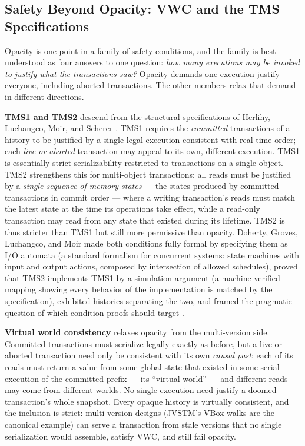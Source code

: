 \subsection{Safety Beyond Opacity: VWC and the TMS Specifications}
\label{sec:safety-family}

Opacity is one point in a family of safety conditions, and the family is
best understood as four answers to one question: \emph{how many executions
may be invoked to justify what the transactions saw?} Opacity demands one
execution justify everyone, including aborted transactions. The other
members relax that demand in different directions.

\textbf{TMS1 and TMS2} descend from the structural specifications of
Herlihy, Luchangco, Moir, and Scherer \cite{herlihy03tms1,herlihy03tms2}.
TMS1 requires the \emph{committed} transactions of a history to be
justified by a single legal execution consistent with real-time order;
each \emph{live or aborted} transaction may appeal to its own, different
execution. TMS1 is essentially strict serializability restricted to
transactions on a single object. TMS2 strengthens this for multi-object
transactions: all reads must be justified by a \emph{single sequence of
memory states} --- the states produced by committed transactions in
commit order --- where a writing transaction's reads must match the latest
state at the time its operations take effect, while a read-only
transaction may read from any state that existed during its lifetime.
TMS2 is thus stricter than TMS1 but still more permissive than opacity.
Doherty, Groves, Luchangco, and Moir made both conditions fully formal by
specifying them as I/O automata (a standard formalism for concurrent
systems: state machines with input and output actions, composed by
intersection of allowed schedules), proved that TMS2 implements TMS1 by a
simulation argument (a machine-verified mapping showing every behavior of
the implementation is matched by the specification), exhibited histories separating the two, and framed
the pragmatic question of which condition proofs should target
\cite{doherty13tms}.

\textbf{Virtual world consistency} \cite{imbs09vwc,imbs12vwc} relaxes
opacity from the multi-version side. Committed transactions must serialize
legally exactly as before, but a live or aborted transaction need only be
consistent with its own \emph{causal past}: each of its reads must return
a value from some global state that existed in some serial execution of
the committed prefix --- its ``virtual world'' --- and different reads may
come from different worlds. No single execution need justify a doomed
transaction's whole snapshot. Every opaque history is virtually
consistent, and the inclusion is strict: multi-version designs (JVSTM's
VBox walks are the canonical example) can serve a transaction from stale
versions that no single serialization would assemble, satisfy VWC, and
still fail opacity.

